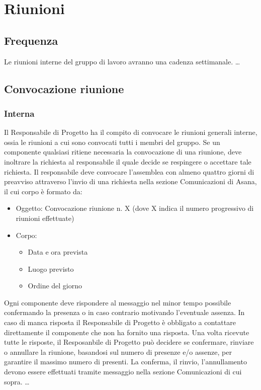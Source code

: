 \documentclass[a4paper]{report}
\newcommand{\mychapter}[2]{
	\setcounter{chapter}{#1}
	\setcounter{section}{0}
	\setcounter{subsection}{1}
	\chapter*{#2}
	\addcontentsline{toc}{chapter}{#2}
}
\begin{document}
	\mychapter{3}{Riunioni}
	\section{Frequenza}
		Le riunioni interne del gruppo di lavoro avranno una cadenza settimanale.
		\dots
	\section{Convocazione riunione}
		\subsection{Interna}
			Il Responsabile di Progetto ha il compito di convocare le riunioni generali interne, ossia
			le riunioni a cui sono convocati tutti i membri del gruppo.
			Se un componente qualsiasi ritiene necessaria la convocazione di una riunione, deve
			inoltrare la richiesta al responsabile il quale decide se respingere o accettare
			tale richiesta.
			Il responsabile deve convocare l'assemblea con almeno quattro giorni di preavviso
			attraverso l'invio di una richiesta nella sezione Comunicazioni di Asana, il cui
			corpo è formato da:
			\begin{itemize}
				\item Oggetto: Convocazione riunione n. X (dove X indica il numero progressivo
				di riunioni effettuate)
				\item Corpo:
				\begin{itemize}
					\item Data e ora prevista
					\item Luogo previsto
					\item Ordine del giorno
				\end{itemize}
			\end{itemize}
			Ogni componente deve rispondere al messaggio nel minor tempo possibile confermando
			la presenza o in caso contrario motivando l'eventuale assenza. In caso di manca risposta
			il Responsabile di Progetto è obbligato a contattare direttamente il componente che non
			ha fornito una risposta. Una volta ricevute tutte le risposte, il Resposanbile di Progetto
			può decidere se confermare, rinviare o annullare la riunione, basandosi sul numero di
			presenze e/o assenze, per garantire il massimo numero di presenti. La conferma, il rinvio,
			l'annullamento devono essere effettuati tramite messaggio nella sezione Comunicazioni di cui
			sopra.
			\dots
\end{document}
